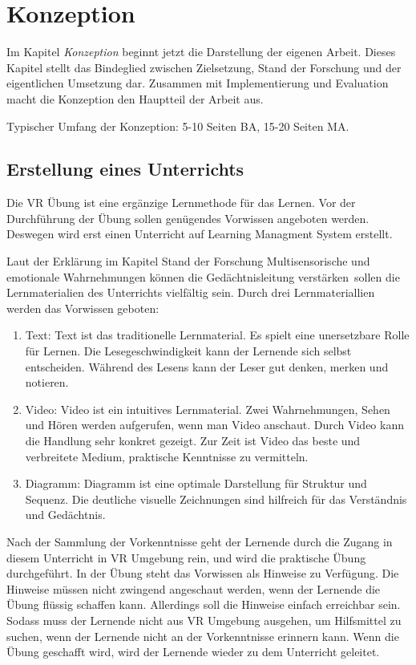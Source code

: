 \chapter{Konzeption}

Im Kapitel {\em Konzeption} beginnt jetzt die Darstellung der eigenen Arbeit. Dieses Kapitel stellt das Bindeglied zwischen Zielsetzung, Stand der Forschung und der eigentlichen Umsetzung dar. Zusammen mit Implementierung und Evaluation macht die Konzeption den Hauptteil der Arbeit aus.

Typischer Umfang der Konzeption: 5-10 Seiten BA, 15-20 Seiten MA.

\section{Erstellung eines Unterrichts}
Die VR Übung ist eine ergänzige Lernmethode für das Lernen. Vor der Durchführung der Übung sollen genügendes Vorwissen angeboten werden. Deswegen wird erst einen Unterricht auf Learning Managment System erstellt.

Laut der Erklärung im Kapitel Stand der Forschung \glqq Multisensorische und emotionale Wahrnehmungen können die Gedächtnisleitung verstärken\grqq\ sollen die Lernmaterialien des Unterrichts vielfältig sein.  Durch drei Lernmateriallien werden das Vorwissen geboten:
\begin{enumerate}
    \item Text: Text ist das traditionelle Lernmaterial. Es spielt eine unersetzbare Rolle für Lernen. Die Lesegeschwindigkeit kann der Lernende sich selbst entscheiden. Während des Lesens kann der Leser gut denken, merken und notieren.
    \item Video: Video ist ein intuitives Lernmaterial. Zwei Wahrnehmungen, Sehen und Hören werden aufgerufen, wenn man Video anschaut. Durch Video kann die Handlung sehr konkret gezeigt. Zur Zeit ist Video das beste und verbreitete Medium, praktische Kenntnisse zu vermitteln.
    \item Diagramm: Diagramm ist eine optimale Darstellung für Struktur und Sequenz. Die deutliche visuelle Zeichnungen sind hilfreich für das Verständnis und Gedächtnis.
\end{enumerate}

Nach der Sammlung der Vorkenntnisse geht der Lernende durch die Zugang in diesem Unterricht in VR Umgebung rein, und wird die praktische Übung durchgeführt. In der Übung steht das Vorwissen als Hinweise zu Verfügung. Die Hinweise müssen nicht zwingend angeschaut werden, wenn der Lernende die Übung flüssig schaffen kann. Allerdings soll die Hinweise einfach erreichbar sein. Sodass muss der Lernende nicht aus VR Umgebung ausgehen, um Hilfsmittel zu suchen, wenn der Lernende nicht an der Vorkenntnisse erinnern kann. Wenn die Übung geschafft wird, wird der Lernende wieder zu dem Unterricht geleitet.


